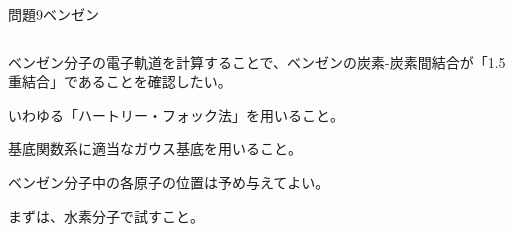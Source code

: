 \documentclass[dvipdfmx]{beamer}
\newenvironment{wideitemize}{\itemize\setlength{\itemsep}{1em}}{\enditemize}
\newenvironment{wideitemize2}{\itemize\setlength{\itemsep}{0.2em}}{\enditemize}
\begin{document}

\begin{frame}{問題9}{ベンゼン}
\begin{columns}[t]
\begin{column}{0.7\textwidth}
\begin{wideitemize}
	\item ベンゼン分子の電子軌道を計算することで、ベンゼンの炭素-炭素間結合が「1.5重結合」であることを確認したい。
	\begin{wideitemize2}
		\item いわゆる「ハートリー・フォック法」を用いること。
		\item 基底関数系に適当なガウス基底を用いること。
		\item ベンゼン分子中の各原子の位置は予め与えてよい。
		\item まずは、水素分子で試すこと。
	\end{wideitemize2}
\end{wideitemize}


\end{column}
\end{columns}
\end{frame}
\end{document}
